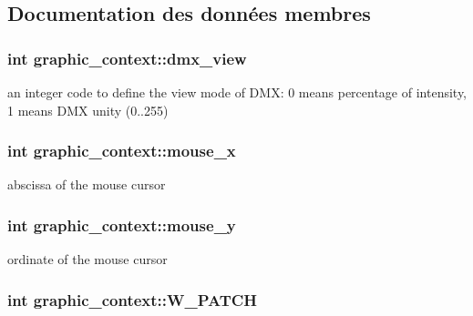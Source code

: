 \subsection{Documentation des données membres}
\hypertarget{classgraphic__context_abeabd1716cb7451605935b9191be65fb}{
\subsubsection[{dmx\+\_\+view}]{\setlength{\rightskip}{0pt plus 5cm}int graphic\+\_\+context\+::dmx\+\_\+view}}\label{classgraphic__context_abeabd1716cb7451605935b9191be65fb}
an integer code to define the view mode of D\+M\+X\+: 0 means percentage of intensity, 1 means D\+M\+X unity (0..255) \hypertarget{classgraphic__context_af9aa907f4c540927888920111f2a3890}{
\subsubsection[{mouse\+\_\+x}]{\setlength{\rightskip}{0pt plus 5cm}int graphic\+\_\+context\+::mouse\+\_\+x}}\label{classgraphic__context_af9aa907f4c540927888920111f2a3890}
abscissa of the mouse cursor \hypertarget{classgraphic__context_a72195ff30744dcb9c467cad5bda4e602}{
\subsubsection[{mouse\+\_\+y}]{\setlength{\rightskip}{0pt plus 5cm}int graphic\+\_\+context\+::mouse\+\_\+y}}\label{classgraphic__context_a72195ff30744dcb9c467cad5bda4e602}
ordinate of the mouse cursor \hypertarget{classgraphic__context_af8795c6d73bb4076febf90a4bed34cd7}{
\subsubsection[{W\+\_\+\+P\+A\+T\+C\+H}]{\setlength{\rightskip}{0pt plus 5cm}int graphic\+\_\+context\+::\+W\+\_\+\+P\+A\+T\+C\+H}}\label{classgraphic__context_af8795c6d73bb4076febf90a4bed34cd7}
